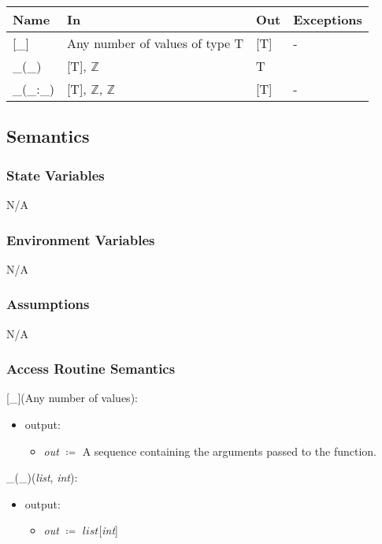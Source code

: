 \documentclass[12pt, titlepage]{article}
\begin{document}
\begin{center}
	\renewcommand*{\arraystretch}{1.5}
	\begin{tabular} {p{}  p{}  p{} 
			p{} } \hline 
		\textbf{Name} & \textbf{In} & \textbf{Out} & \textbf{Exceptions} \\ 
		\hline
		
		[\_] & Any number of values of type T & [T] & - \\ 
		\_(\_) & [T], $\mathbb{Z}$ & T & \\
		\_(\_:\_) & [T], $\mathbb{Z}$, $\mathbb{Z}$ & [T] & - \\\hline
	\end{tabular}
\end{center}

\subsection{Semantics}

\subsubsection{State Variables}
N/A

\subsubsection{Environment Variables}

N/A

\subsubsection{Assumptions}

N/A

\subsubsection{Access Routine Semantics}

[\_](Any number of values):
\begin{itemize}
	\item output: 
	\begin{itemize}
		\item[] \textit{out} $\coloneqq$ A sequence containing the arguments 
		passed to the function.
	\end{itemize}
\end{itemize}

\noindent \_(\_)(\textit{list}, \textit{int}):
\begin{itemize}
	\item output: 
	\begin{itemize}
		\item[] \textit{out} $\coloneqq$ $list$[\textit{int}]	
	\end{itemize}
\end{itemize}
\end{document}
